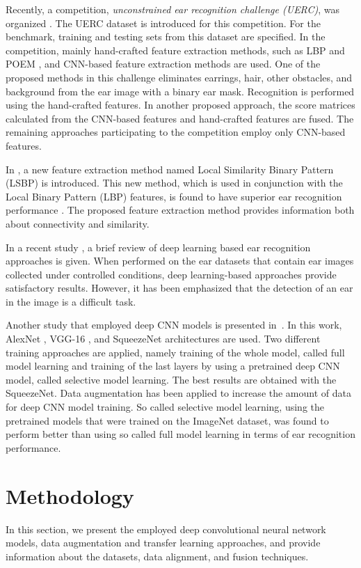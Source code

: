 \documentclass[11pt,journal,compsoc]{IEEEtran}
\begin{document}
Recently, a competition, \textit{unconstrained ear recognition challenge (UERC)}, was organized \cite{Emersic_2017_b}. The UERC dataset is introduced for this competition. For the benchmark, training and testing sets from this dataset are specified. In the competition, mainly hand-crafted feature extraction methods, such as LBP \cite{Wang_2011} and POEM \cite{Vu_2010}, and CNN-based feature extraction methods are used. One of the proposed methods in this challenge eliminates earrings, hair, other obstacles, and background from the ear image with a binary ear mask. Recognition is performed using the hand-crafted features. In another proposed approach, the score matrices calculated from the CNN-based features and hand-crafted features are fused. The remaining approaches participating to the competition employ only CNN-based features.

In \cite{Guo_2008}, a new feature extraction method named Local Similarity Binary Pattern (LSBP) is introduced. This new method, which is used in conjunction with the Local Binary Pattern (LBP) features, is found to have superior ear recognition performance \cite{Guo_2008}. The proposed feature extraction method provides information both about connectivity and similarity.

In a recent study \cite{Galdamez_2016}, a brief review of deep learning based ear recognition approaches is given. When performed on the ear datasets that contain ear images collected under controlled conditions, deep learning-based approaches provide satisfactory results. However, it has been emphasized that the detection of an ear in the image is a difficult task. 

Another study that employed deep CNN models is presented in~\cite{Emersic_2017_c}. In this work, AlexNet \cite{Krizhevsky_2012}, VGG-16 \cite{Simonyan_2014}, and SqueezeNet \cite{Iandola_2016} architectures are used. Two different training approaches are applied, namely training of the whole model, called full model learning and training of the last layers by using a pretrained deep CNN model, called selective model learning. The best results are obtained with the SqueezeNet. Data augmentation has been applied to increase the amount of data for deep CNN model training. So called selective model learning, using the pretrained models that were trained on the ImageNet dataset, was found to perform better than using so called full model learning in terms of ear recognition performance.

\section{Methodology}\label{sec2}
In this section, we present the employed deep convolutional neural network models, data augmentation and transfer learning approaches, and provide information about the datasets, data alignment, and fusion techniques.
\end{document}
